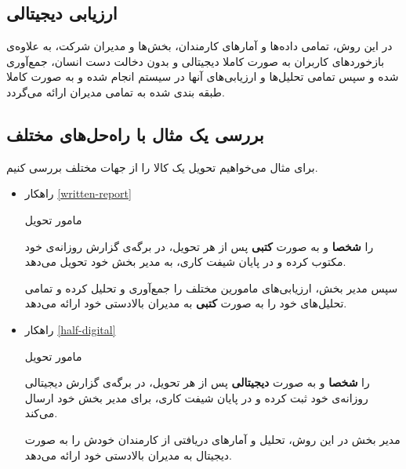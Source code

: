 \documentclass[12pt]{article}
\begin{document}
\subsection{ارزیابی دیجیتالی }\label{full-digital}
در این روش، تمامی داده‌ها و آمار‌های کارمندان، بخش‌ها و مدیران شرکت، به علاوه‌ی بازخورد‌های کاربران به صورت کاملا دیجیتالی و بدون دخالت دست انسان، جمع‌آوری شده و سپس تمامی تحلیل‌ها و ارزیابی‌های آنها در سیستم  انجام شده و به صورت کاملا طبقه بندی شده به تمامی مدیران ارائه می‌گردد.

\subsection{بررسی یک مثال با راه‌حل‌های مختلف}
برای مثال می‌خواهیم تحویل یک کالا را از جهات مختلف بررسی کنیم.
\begin{itemize}
    \item راهکار \ref{written-report}
    
    مامور تحویل 
     را \textbf{شخصا} و به صورت \textbf{کتبی} پس از هر تحویل، در برگه‌ی گزارش روزانه‌ی خود مکتوب کرده و در پایان شیفت کاری، به مدیر بخش خود تحویل می‌دهد.
    
    سپس مدیر بخش، ارزیابی‌های مامورین مختلف را جمع‌آوری و تحلیل کرده و تمامی تحلیل‌های خود را به صورت \textbf{کتبی} به مدیران بالادستی خود ارائه می‌دهد.
    
    \item راهکار \ref{half-digital}
    
       مامور تحویل 
       را \textbf{شخصا} و به صورت \textbf{دیجیتالی} پس از هر تحویل، در برگه‌ی گزارش دیجیتالی روزانه‌ی خود ثبت کرده و در پایان شیفت کاری، برای مدیر بخش خود ارسال می‌کند.
       
    مدیر بخش در این روش، تحلیل‌ و آمار‌های دریافتی از کارمندان خودش را به صورت دیجیتال به مدیران بالادستی خود ارائه می‌دهد.
    

\end{itemize}
\end{document}
